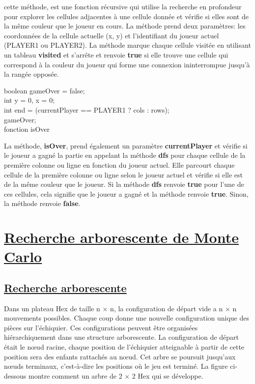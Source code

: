 \documentclass[12pt]{article}
\begin{document}
cette méthode, est une fonction récursive qui utilise la recherche en profondeur pour explorer les cellules adjacentes à une cellule donnée et vérifie si elles sont de la même couleur que le joueur en cours. La méthode prend deux paramètres: les coordonnées de la cellule actuelle (x, y) et l'identifiant du joueur actuel (PLAYER1 ou PLAYER2). La méthode marque chaque cellule visitée en utilisant un tableau \textbf{visited} et s'arrête et renvoie \textbf{true} si elle trouve une cellule qui correspond à la couleur du joueur qui forme une connexion ininterrompue jusqu'à la rangée opposée.
\begin{algorithm}
\SetAlgoLined
{}
boolean gameOver = false;\\
int y = 0, x = 0;\\
int end = (currentPlayer == PLAYER1 ? cols : rows);\\
\Return gameOver;\\
\caption{fonction isOver}
\end{algorithm}
\newpage
La  méthode, \textbf{isOver}, prend également un paramètre \textbf{currentPlayer} et vérifie si le joueur a gagné la partie en appelant la méthode \textbf{dfs} pour chaque cellule de la première colonne ou ligne en fonction du joueur actuel. Elle parcourt chaque cellule de la première colonne ou ligne selon le joueur actuel et vérifie si elle est de la même couleur que le joueur. Si la méthode \textbf{dfs} renvoie \textbf{true} pour l'une de ces cellules, cela signifie que le joueur a gagné et la méthode renvoie \textbf{true}. Sinon, la méthode renvoie \textbf{false}.
\section{\underline{Recherche arborescente de Monte Carlo}}
 \subsection{\underline{Recherche arborescente }}
Dans un plateau Hex de taille n × n, la configuration de départ vide a n × n mouvements possibles. Chaque coup donne une nouvelle configuration unique des pièces sur l'échiquier. Ces configurations peuvent être organisées hiérarchiquement dans une structure arborescente. La configuration de départ était le nœud
 racine, chaque position de l'échiquier atteignable à partir de cette position sera des enfants rattachés au nœud. Cet arbre se poursuit jusqu'aux nœuds terminaux, c'est-à-dire les positions où le jeu est terminé. La figure ci-dessous montre comment un arbre de 2 × 2 Hex qui se développe.
\end{document}
